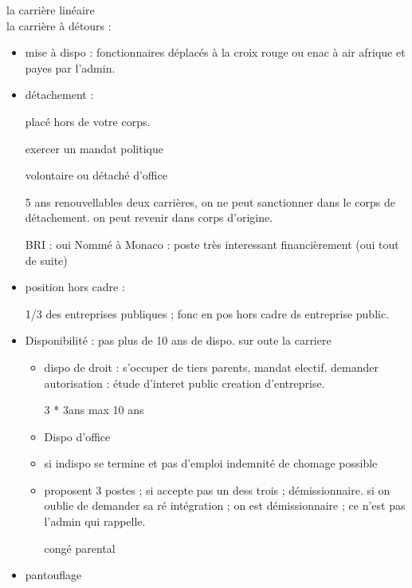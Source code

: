 \documentclass[a4paper,12pt]{article}
\begin{document}
la carrière linéaire\\
la carrière à détours : \\
\begin{itemize}
\item mise à dispo	: fonctionnaires déplacés à la croix rouge ou enac à air afrique
et payes par l'admin.

\item détachement : 

placé hors de votre corps.

exercer un mandat politique

volontaire ou détaché d'office

5 ans renouvellables
deux carrières, on ne peut sanctionner dans le corps de détachement.
on peut revenir dans corps d'origine.

BRI : oui
Nommé à Monaco : poste très interessant financièrement (oui tout de suite)

\item position hors cadre :

1/3 des entreprises publiques ; 
fonc en pos hors cadre ds entreprise public.

\item Disponibilité : pas plus de 10 ans de dispo. sur oute la carriere

     \begin{itemize}
     	\item dispo de droit : s'occuper de tiers parents, mandat electif.
     	demander autorisation : 
     	étude d'interet public
     	creation d'entreprise.
     	
     	3 * 3ans max 10 ans
     	
     	\item Dispo d'office
     	\item si indispo se termine et pas d'emploi indemnité de chomage possible
     	\item proposent 3 postes ; si accepte pas un dess trois ; démissionnaire.
     	si on oublie de demander sa ré intégration ; on est démissionnaire ; 
     	ce n'est pas l'admin qui rappelle.
     	
     	congé parental 
     	
     \end{itemize}

\item pantouflage
\end{itemize}
\end{document}
